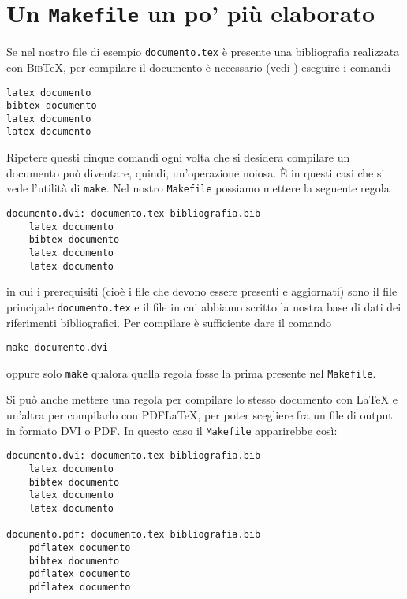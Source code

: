 \section{Un \texttt{Makefile} un po' più elaborato}
\label{sec:makefile-elaborato}

Se nel nostro file di esempio \verb|documento.tex| è presente una bibliografia
realizzata con \textsc{Bib}\TeX, per compilare il documento è necessario (vedi
\textcite[120]{pantieri:latex}) eseguire i comandi
\begin{verbatim}
latex documento
bibtex documento
latex documento
latex documento
\end{verbatim}

Ripetere questi cinque comandi ogni volta che si desidera compilare un documento
può diventare, quindi, un'operazione noiosa.  È in questi casi che si vede
l'utilità di \verb|make|.  Nel nostro \verb|Makefile| possiamo mettere la
seguente regola
\begin{lstlisting}
documento.dvi: documento.tex bibliografia.bib
	latex documento
	bibtex documento
	latex documento
	latex documento
\end{lstlisting}
in cui i prerequisiti (cioè i file che devono essere presenti e aggiornati) sono
il file principale \verb|documento.tex| e il file in cui abbiamo scritto la
nostra base di dati dei riferimenti bibliografici.  Per compilare è sufficiente
dare il comando
\begin{verbatim}
make documento.dvi
\end{verbatim}
oppure solo \verb|make| qualora quella regola fosse la prima presente nel
\verb|Makefile|.

Si può anche mettere una regola per compilare lo stesso documento con \LaTeX{}
e un'altra per compilarlo con \textsc{PDF}\LaTeX, per poter scegliere fra un
file di output in formato \textsc{DVI} o \textsc{PDF}.  In questo caso il
\verb|Makefile| apparirebbe così:
\begin{lstlisting}[caption={La prima regola permette di compilare un documento con
\LaTeX, la seconda con \textsc{PDF}\LaTeX},label=lst:dvi-pdf]
documento.dvi: documento.tex bibliografia.bib
	latex documento
	bibtex documento
	latex documento
	latex documento

documento.pdf: documento.tex bibliografia.bib
	pdflatex documento
	bibtex documento
	pdflatex documento
	pdflatex documento
\end{lstlisting}

